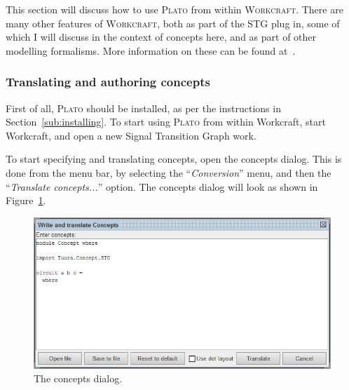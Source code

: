 \documentclass[british,conference,compsoc]{IEEEtran}
\newcommand{\noun}[1]{\textsc{#1}}
\begin{document}
\vspace{-2mm}

This section will discuss how to use \noun{Plato} from within
\noun{Workcraft}. There are many other features of \noun{Workcraft}, both as 
part of the STG plug in, some of which I will discuss in the context of 
concepts here, and as part of other modelling formalisms. More information on 
these can be found at~\cite{Workcraft_website}.

\vspace{-2mm}
 
\subsubsection{Translating and authoring concepts}

First of all, \noun{Plato} should be installed, as per the instructions in
Section~\ref{sub:installing}. To start using \noun{Plato} from within Workcraft, 
start Workcraft, and open a new Signal Transition Graph work. 

To start specifying and translating concepts, open the concepts dialog.  This is
done from the menu bar, by selecting the ``\emph{Conversion}'' menu, and then
the ``\emph{Translate concepts...}'' option. The concepts dialog will look as 
shown in Figure~\ref{fig:concepts_dialog_screenshot}.


\begin{figure}[h]
\begin{centering}
\includegraphics[scale=0.45]{Images/concepts_dialog_screenshot.png}
\par\end{centering}

\begin{centering}
\protect\caption{\label{fig:concepts_dialog_screenshot}The concepts dialog.}

\par\end{centering}
\vspace{-4mm}
\end{figure}
\end{document}
